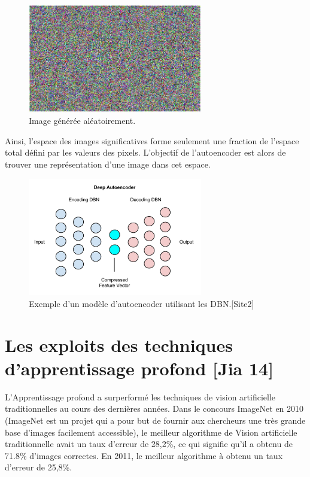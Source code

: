 \begin{figure}[H]
	\centering
		\includegraphics[width=3in]{Figures/randomImageGEn.JPG}
	\caption[An Electron]{Image générée aléatoirement.}
	\label{fig:Electron}
\end{figure}

Ainsi, l'espace des images significatives forme seulement une fraction de l'espace total défini par les valeurs des pixels. L'objectif de l'autoencoder est alors de trouver une représentation d'une image dans cet espace.


\begin{figure}[H]
	\centering
		\includegraphics[width=3in]{Figures/deep_autoencoder.png}
	\caption[An Electron]{Exemple d'un modèle d'autoencoder utilisant les DBN.[Site2]}
	\label{fig:Electron}
\end{figure}

\section{Les exploits des techniques d'apprentissage profond [Jia 14]}

L'Apprentissage profond a surperformé les techniques de vision artificielle traditionnelles au cours des dernières années. Dans le concours ImageNet en 2010 (ImageNet est un projet qui a pour but de fournir aux chercheurs une très grande base d'images facilement accessible), le meilleur algorithme de Vision artificielle traditionnelle avait un taux d'erreur de 28,2\%, ce qui signifie qu'il a obtenu de 71.8\% d'images correctes. En 2011, le meilleur algorithme à obtenu un taux d'erreur de 25,8\%. 

